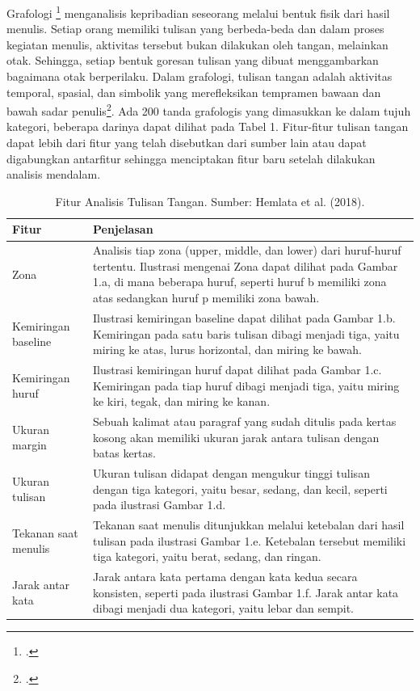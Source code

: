 \documentclass[a4paper,twoside]{article}
\begin{document}
	Grafologi \footcite{hemlata2018personality} menganalisis kepribadian seseorang melalui bentuk fisik dari hasil menulis. Setiap orang memiliki tulisan yang berbeda-beda dan dalam proses kegiatan menulis, aktivitas tersebut bukan dilakukan
	oleh tangan, melainkan otak. Sehingga, setiap bentuk goresan tulisan yang dibuat menggambarkan bagaimana otak berperilaku. Dalam grafologi, tulisan tangan adalah aktivitas temporal, spasial, dan simbolik yang merefleksikan tempramen 
	bawaan dan bawah sadar penulis\footcite{Marano2021Graphology}. Ada 200 tanda grafologis yang dimasukkan ke dalam tujuh kategori, beberapa darinya dapat dilihat pada Tabel 1. Fitur-fitur tulisan tangan dapat lebih dari fitur yang telah 
	disebutkan dari sumber lain atau dapat digabungkan antarfitur sehingga menciptakan fitur baru setelah dilakukan analisis mendalam.
	\begin{table}[H]
		\caption{Fitur Analisis Tulisan Tangan. Sumber: Hemlata et al. (2018).}
		\label{tab:tabel_fitur}
		\begin{tabularx}{\textwidth}{|l|X|}
			\hline
			\textbf{Fitur} & \textbf{Penjelasan} \\
			\hline
			Zona & Analisis tiap zona (upper, middle, dan lower) dari huruf-huruf tertentu. Ilustrasi mengenai Zona dapat dilihat pada Gambar 1.a, 
			di mana beberapa huruf, seperti huruf b memiliki zona atas sedangkan huruf p memiliki zona bawah. \\
			\hline
			Kemiringan baseline & Ilustrasi kemiringan baseline dapat dilihat pada Gambar 1.b. Kemiringan pada satu baris tulisan dibagi menjadi tiga, yaitu miring ke atas, lurus horizontal, 
			dan miring ke bawah. \\
			\hline
			Kemiringan huruf & Ilustrasi kemiringan huruf dapat dilihat pada Gambar 1.c. Kemiringan pada tiap huruf dibagi menjadi tiga, yaitu miring ke kiri, tegak, dan miring ke kanan. \\
			\hline
			Ukuran margin & Sebuah kalimat atau paragraf yang sudah ditulis pada kertas kosong akan memiliki ukuran jarak antara 
			tulisan dengan batas kertas. \\
			\hline
			Ukuran tulisan & Ukuran tulisan didapat dengan mengukur tinggi tulisan dengan tiga kategori, yaitu besar, sedang, dan kecil, seperti pada ilustrasi Gambar 1.d. \\
			\hline
			Tekanan saat menulis & Tekanan saat menulis ditunjukkan melalui ketebalan dari hasil tulisan pada ilustrasi Gambar 1.e. Ketebalan tersebut memiliki 
			tiga kategori, yaitu berat, sedang, dan ringan. \\
			\hline
			Jarak antar kata & Jarak antara kata pertama dengan kata kedua secara konsisten, seperti pada ilustrasi Gambar 1.f. Jarak antar kata dibagi menjadi dua 
			kategori, yaitu lebar dan sempit. \\
			\hline
		\end{tabularx}
	\end{table}
\end{document}
